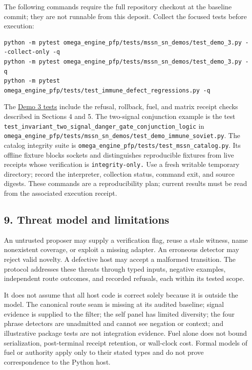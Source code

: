 \documentclass[
  11pt,
]{article}
\begin{document}
The following commands require the full repository checkout at the
baseline commit; they are not runnable from this deposit. Collect the
focused tests before execution:

\begin{lstlisting}
python -m pytest omega_engine_pfp/tests/mssn_sn_demos/test_demo_3.py --collect-only -q
python -m pytest omega_engine_pfp/tests/mssn_sn_demos/test_demo_3.py -q
python -m pytest omega_engine_pfp/tests/test_immune_defect_regressions.py -q
\end{lstlisting}

The
\href{https://github.com/dbccpage/the_symbol_game/blob/52cb5457f6c485ba548cfd292f6012a941ed22cf/omega_engine_pfp/tests/mssn_sn_demos/test_demo_3.py}{Demo
3 tests} include the refusal, rollback, fuel, and matrix receipt checks
described in Sections 4 and 5. The two-signal conjunction example is the
test \nolinkurl{test_invariant_two_signal_danger_gate_conjunction_logic}
in
\nolinkurl{omega_engine_pfp/tests/mssn_sn_demos/test_demo_immune_soviet.py}.
The catalog integrity suite is
\nolinkurl{omega_engine_pfp/tests/test_mssn_catalog.py}. Its offline
fixture blocks sockets and distinguishes reproducible fixtures from live
receipts whose verification is \nolinkurl{integrity-only.} Use a fresh
writable temporary directory; record the interpreter, collection status,
command exit, and source digests. These commands are a reproducibility
plan; current results must be read from the associated execution
receipt.

\subsection{9. Threat model and
limitations}\label{threat-model-and-limitations}

An untrusted proposer may supply a verification flag, reuse a stale
witness, name nonexistent coverage, or exploit a missing adapter. An
erroneous detector may reject valid novelty. A defective host may accept
a malformed transition. The protocol addresses these threats through
typed inputs, negative examples, independent route outcomes, and
recorded refusals, each within its tested scope.

It does not assume that all host code is correct solely because it is
outside the model. The canonical route seam is missing at its audited
baseline; signal evidence is supplied to the filter; the self panel has
limited diversity; the four phrase detectors are unadmitted and cannot
see negation or context; and illustrative package tests are not
integration evidence. Fuel alone does not bound serialization,
post-terminal receipt retention, or wall-clock cost. Formal models of
fuel or authority apply only to their stated types and do not prove
correspondence to the Python host.
\end{document}
